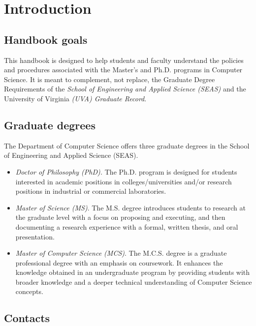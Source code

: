 
\hypertarget{introduction}{%
\section{Introduction}\label{introduction}}

\subsection{Handbook goals}

This handbook is designed to help students and faculty understand the policies
and procedures associated with the Master's and Ph.D. programs in Computer
Science. It is meant to complement, not replace, the Graduate Degree
Requirements of the \textit{School of Engineering and Applied Science
(SEAS)} and the University of Virginia \textit{(UVA) Graduate Record}.

\subsection{Graduate degrees}

The Department of Computer Science offers three graduate degrees in the
School of Engineering and Applied Science (SEAS).

\begin{itemize}
\item \emph{Doctor of Philosophy (PhD).} The Ph.D. program is designed for
 students interested in academic positions in colleges/universities and/or
 research positions in industrial or commercial laboratories.

\item \emph{Master of Science (MS)}. The M.S. degree introduces students to
 research at the graduate level with a focus on proposing and executing, and
 then documenting a research experience with a formal, written thesis, and oral
 presentation.

\item \emph{Master of Computer Science (MCS)}. The M.C.S. degree is a graduate
 professional degree with an emphasis on coursework. It enhances the knowledge
 obtained in an undergraduate program by providing students with broader
 knowledge and a deeper technical understanding of Computer Science concepts.

\end{itemize}

\subsection{Contacts}
\label{contacts}


